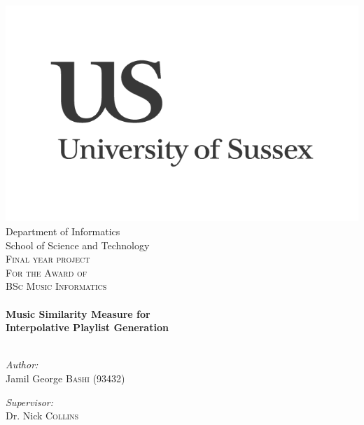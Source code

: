 \begin{titlepage}
\begin{center}
\texttt{}\\
\includegraphics[width=0.5\linewidth]{front/images/us-logo}\\
\small Department of Informatics\\
School of Science and Technology\\[2cm]

\textsc{\Large Final year project\\
\small For the Award of\\
\Large BSc Music Informatics}\\[1cm]

\hrulefill \\[0.8cm]
{ \huge \bfseries Music Similarity Measure for\\
Interpolative Playlist Generation}\\[0.8cm]

\hrulefill \\[2.5cm]
\begin{minipage}{0.45\textwidth}
\begin{flushleft} \large
\emph{Author:}\\
Jamil George \textsc{Bashi} (93432)
\end{flushleft}
\end{minipage}
\begin{minipage}{0.45\textwidth}
\begin{flushright} \large
\emph{Supervisor:} \\
Dr. Nick \textsc{Collins}
\end{flushright}
\end{minipage}
\vspace{25cm}

\end{center}
\end{titlepage}
